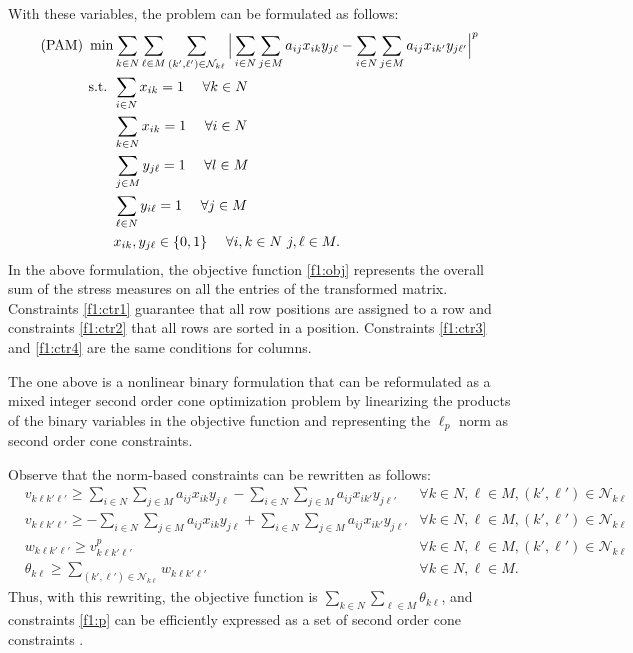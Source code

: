 \documentclass[a4paper,11pt, reqno]{amsart}
\def\N{\mathcal{N}}
\newcommand{\dsum}{\displaystyle\sum}
\begin{document}
With these variables, the problem can be formulated as follows:
\begin{align} \hbox{(PAM) }
    \min & \sum_{k\in N}\sum_{\ell \in M} \sum_{(k',\ell ') \in \mathcal{N}_{k\ell}} 
    \Big|\sum_{i\in N}\sum_{j\in M} a_{ij}x_{ik} y_{j\ell} -
         \sum_{i\in N}\sum_{j\in M} a_{ij}x_{ik'}y_{j\ell '} \Big|^p \label{f1:obj}\\
    \mbox{s.t. } 
    & \sum_{i \in N} x_{ik} = 1\ \ \ \ \forall k \in N\label{f1:ctr1}\\
    & \sum_{k \in N} x_{ik} = 1 \ \ \ \ \forall i \in N\label{f1:ctr2}\\
    &\sum_{j \in M} y_{j\ell} = 1 \ \ \ \ \forall l \in M\label{f1:ctr3}\\
    & \sum_{\ell\in N} y_{i\ell} = 1\ \  \ \ \forall j \in M\label{f1:ctr4}\\
    & x_{ik}, y_{j\ell} \in \{0,1\}\ \ \ \ \forall i,k \in N\ j,\ell \in M.\label{f1:ctr5}
\end{align}
In the above formulation, the objective function \eqref{f1:obj} represents the overall sum of the stress measures on all the entries of the transformed matrix. Constraints \eqref{f1:ctr1} guarantee that all row positions are assigned to a row and constraints \eqref{f1:ctr2} that all rows are sorted in a position. Constraints \eqref{f1:ctr3} and \eqref{f1:ctr4} are the same conditions for columns. 

The one above is a nonlinear binary formulation that can be reformulated as a mixed integer second order cone optimization problem by linearizing the products of the binary variables in the objective function and representing the $\ell_p$ norm as second order cone constraints. 

Observe that the norm-based constraints can be rewritten as follows:
\begin{align}
&v_{k\ell k'\ell '}  \ge 
\sum_{i\in N}\sum_{j\in M} a_{ij} x_{ik} y_{j\ell } -
\sum_{i\in N}\sum_{j\in M} a_{ij}x_{ik'} y_{j\ell'} & \forall k \in N, \ell  \in M, (k',\ell ')\in \N_{k\ell }\label{ctr:NL1}\\
&v_{k\ell k'\ell '}  \ge 
-\sum_{i\in N}\sum_{j\in M} a_{ij} x_{ik} y_{j\ell } +
 \sum_{i\in N}\sum_{j\in M} a_{ij}x_{ik'} y_{j\ell'} & \forall k \in N, \ell \in M, (k',\ell ')\in \N_{k\ell }\label{ctr:NL2}\\
&w_{k\ell k'\ell '}  \ge v_{k\ell k'\ell '}^p & \forall k \in N, \ell \in M, (k',\ell ')\in \N_{k\ell } \label{f1:p}\\
&\theta_{k\ell }  \ge \sum_{(k',\ell ')\in \N_{k\ell }} w_{k\ell k'\ell '} &
\forall k \in N, \ell \in M.
\end{align}
Thus, with this rewriting, the objective function is $
\dsum_{k\in N} \dsum_{\ell \in M} \theta_{k\ell}
$, 
and constraints \eqref{f1:p} can be efficiently expressed as a set of second order cone constraints \citep[see e.g.][]{blanco2024minimal,blanco2014revisiting}. 
\end{document}
